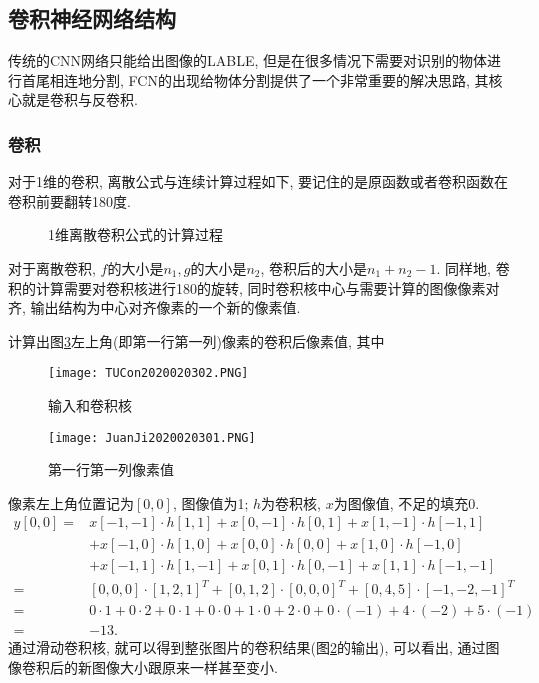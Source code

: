\subsection{卷积神经网络结构}
传统的CNN网络只能给出图像的LABLE, 但是在很多情况下需要对识别的物体进行首尾相连地分割, FCN的出现给物体分割提供了一个非常重要的解决思路, 其核心就是卷积与反卷积.
\subsubsection{卷积}
对于1维的卷积, 离散公式与连续计算过程如下, 要记住的是原函数或者卷积函数在卷积前要翻转180度.
\begin{figure}[H]
\centering
{}
\caption{1维离散卷积公式的计算过程}
\label{ConvolutionOP0203}
\end{figure}

对于离散卷积, $f$的大小是$n_1, g$的大小是$n_2$, 卷积后的大小是$n_1+n_2-1$.
同样地, 卷积的计算需要对卷积核进行180的旋转, 同时卷积核中心与需要计算的图像像素对齐, 输出结构为中心对齐像素的一个新的像素值.
\begin{example}
计算出图\ref{JuanJi2020020301}左上角(即第一行第一列)像素的卷积后像素值, 其中
\begin{figure}[H]
\centering
\texttt{[image: TUCon2020020302.PNG]}
\caption{输入和卷积核}
\label{TUCon2020020302}
\end{figure}
\begin{figure}[H]
\centering
\texttt{[image: JuanJi2020020301.PNG]}
\caption{第一行第一列像素值}
\label{JuanJi2020020301}
\end{figure}
像素左上角位置记为$[0,0]$, 图像值为1; $h$为卷积核, $x$为图像值, 不足的填充0.
$$
\begin{aligned}
y[0,0]=& x[-1,-1] \cdot h[1,1]+x[0,-1] \cdot h[0,1]+x[1,-1] \cdot h[-1,1] \\
       &+x[-1,0] \cdot h[1,0]+x[0,0] \cdot h[0,0]+x[1,0] \cdot h[-1,0] \\
       &+x[-1,1] \cdot h[1,-1]+x[0,1] \cdot h[0,-1]+x[1,1] \cdot h[-1,-1] \\
      =&[0,0,0]\cdot [1,2,1]^T+[0,1,2]\cdot [0,0,0]^T+[0,4,5]\cdot [-1,-2,-1]^T\\
      =& 0\cdot 1+0 \cdot 2+0 \cdot 1+0 \cdot 0+1 \cdot 0+2 \cdot 0+0 \cdot(-1)+4 \cdot(-2)+5 \cdot(-1)\\
      =&-13.
\end{aligned}$$
通过滑动卷积核, 就可以得到整张图片的卷积结果(图\ref{TUCon2020020302}的输出), 可以看出, 通过图像卷积后的新图像大小跟原来一样甚至变小.
\end{example}

